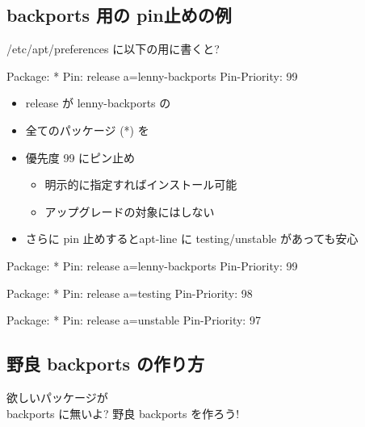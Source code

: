 \documentclass[mingoth,a4paper]{jsarticle}
\begin{document}
\subsection{backports 用の pin止めの例}


/etc/apt/preferences に以下の用に書くと?


\begin{commandline}
Package: *
Pin: release a=lenny-backports
Pin-Priority: 99
\end{commandline}

\begin{itemize}
\item release が lenny-backports の
\item 全てのパッケージ (*) を
\item 優先度 99 にピン止め

\begin{itemize}
\item 明示的に指定すればインストール可能
\item アップグレードの対象にはしない
\end{itemize}
\end{itemize}







\begin{itemize}
\item さらに pin 止めするとapt-line に testing/unstable があっても安心
\end{itemize}

\begin{commandline}
Package: *
Pin: release a=lenny-backports
Pin-Priority: 99

Package: *
Pin: release a=testing
Pin-Priority: 98

Package: *
Pin: release a=unstable
Pin-Priority: 97
\end{commandline}







\subsection{野良 backports の作り方}

欲しいパッケージが \\backports に無いよ?
野良 backports を作ろう!
\end{document}
